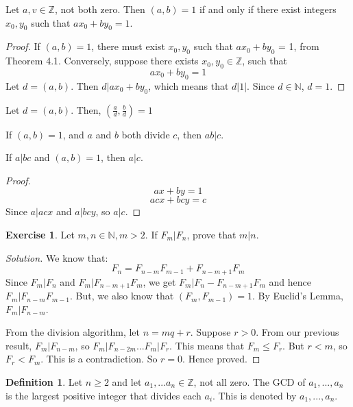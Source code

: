 \documentclass[12pt,letterpaper]{amsbook}
\theoremstyle{definition}
\newtheorem{definition}{Definition} %
\newtheorem*{exercise}{Exercise}
\newenvironment{solution}
  {\renewcommand\qedsymbol{$\blacksquare$}\begin{proof}[Solution]}
  {\end{proof}}
\newcommand{\N}{\mathbb{N}}
\newcommand{\Z}{\mathbb{Z}}
\begin{document}
\begin{theorem}
  Let $a,v \in \Z$, not both zero. Then $(a,b) = 1$ if and only if there exist integers $x_0,y_0$ such that $ax_0 + by_0 = 1$.
\end{theorem}
\begin{proof}
  If $(a,b) = 1$, there must exist $x_0,y_0$ such that $ax_0+by_0$ = 1, from Theorem 4.1.
  Conversely, suppose there exists $x_0,y_0 \in \Z$, such that
  \[ax_0 + by_0 = 1\]
  Let $d = (a,b)$. Then $d|ax_0+by_0$, which means that $d|1|$. Since $d \in \N$, $d=1$.
\end{proof}

\begin{corollary}
  Let $d = (a,b)$. Then, $(\frac{a}{d}, \frac{b}{d}) = 1$
\end{corollary}

\begin{corollary}
  If $(a,b) = 1$, and $a$ and $b$ both divide $c$, then $ab|c$.
\end{corollary}

\begin{theorem}
  If $a|bc$ and $(a,b) = 1$, then $a|c$.
\end{theorem}
\begin{proof}
  \[ax+by = 1\]
  \[acx+bcy=c\]
  Since $a|acx$ and $a|bcy$, so $a|c$.
\end{proof}

\begin{exercise}
  Let $m, n \in \N, m > 2$. If $F_m|F_n$, prove that $m|n$.
\end{exercise}
\begin{solution}
  We know that:
  \[F_n = F_{n-m}F_{m-1} + F_{n-m+1}F_m\]
  Since $F_m|F_n$ and $F_m|F_{n-m+1}F_m$, we get $F_m|F_n-F_{n-m+1}F_m$ and hence $F_m|F_{n-m}F_{m-1}$. But, we also know that $(F_m,F_{m-1}) = 1$. By Euclid's Lemma, $F_m|F_{n-m}$.

  From the division algorithm, let $n = mq+r$. Suppose $r > 0$. From our previous result, $F_m|F_{n-m}$, so $F_m|F_{n-2m}...F_m|F_r$. This means that $F_m \leq F_r$. But $r < m$, so $F_r < F_m$. This is a contradiction. So $r = 0$. Hence proved.
\end{solution}

\begin{definition}
  Let $n \geq 2$ and let $a_1,...a_n \in \Z$, not all zero. The GCD of $a_1,...,a_n$ is the largest positive integer that divides each $a_i$. This is denoted by $a_1,...,a_n$.
\end{definition}
\end{document}
